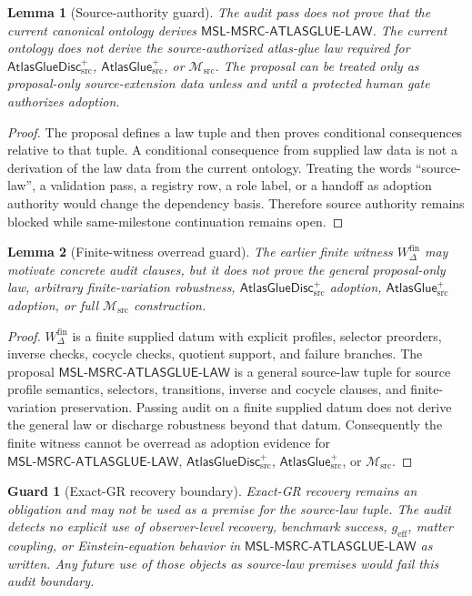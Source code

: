 \documentclass[11pt]{article}
\newcommand{\Msrc}{\mathcal{M}_{\mathrm{src}}}
\newcommand{\AtlasGlue}{\mathsf{AtlasGlue}_{\mathrm{src}}^{+}}
\newcommand{\AtlasGlueDisc}{\mathsf{AtlasGlueDisc}_{\mathrm{src}}^{+}}
\newcommand{\MSL}{\mathsf{MSL}\mbox{-}\mathsf{MSRC}\mbox{-}\mathsf{ATLASGLUE}\mbox{-}\mathsf{LAW}}
\newcommand{\Wfin}{W_{\Delta}^{\mathrm{fin}}}
\newtheorem{lemma}{Lemma}
\newtheorem{guard}{Guard}
\begin{document}
\begin{lemma}[Source-authority guard]
The audit pass does not prove that the current canonical ontology derives
\(\MSL\). The current ontology does not derive the source-authorized
atlas-glue law required for \(\AtlasGlueDisc\), \(\AtlasGlue\), or \(\Msrc\).
The proposal can be treated only as proposal-only source-extension data unless
and until a protected human gate authorizes adoption.
\end{lemma}

\begin{proof}
The proposal defines a law tuple and then proves conditional consequences
relative to that tuple. A conditional consequence from supplied law data is
not a derivation of the law data from the current ontology. Treating the words
``source-law'', a validation pass, a registry row, a role label, or a handoff
as adoption authority would change the dependency basis. Therefore source
authority remains blocked while same-milestone continuation remains open.
\end{proof}

\begin{lemma}[Finite-witness overread guard]
The earlier finite witness \(\Wfin\) may motivate concrete audit clauses, but
it does not prove the general proposal-only law, arbitrary finite-variation
robustness, \(\AtlasGlueDisc\) adoption, \(\AtlasGlue\) adoption, or full
\(\Msrc\) construction.
\end{lemma}

\begin{proof}
\(\Wfin\) is a finite supplied datum with explicit profiles, selector
preorders, inverse checks, cocycle checks, quotient support, and failure
branches. The proposal \(\MSL\) is a general source-law tuple for source
profile semantics, selectors, transitions, inverse and cocycle clauses, and
finite-variation preservation. Passing audit on a finite supplied datum does
not derive the general law or discharge robustness beyond that datum.
Consequently the finite witness cannot be overread as adoption evidence for
\(\MSL\), \(\AtlasGlueDisc\), \(\AtlasGlue\), or \(\Msrc\).
\end{proof}

\begin{guard}[Exact-GR recovery boundary]
Exact-GR recovery remains an obligation and may not be used as a premise for
the source-law tuple. The audit detects no explicit use of observer-level
recovery, benchmark success, \(g_{\mathrm{eff}}\), matter coupling, or
Einstein-equation behavior in \(\MSL\) as written. Any future use of those
objects as source-law premises would fail this audit boundary.
\end{guard}
\end{document}
